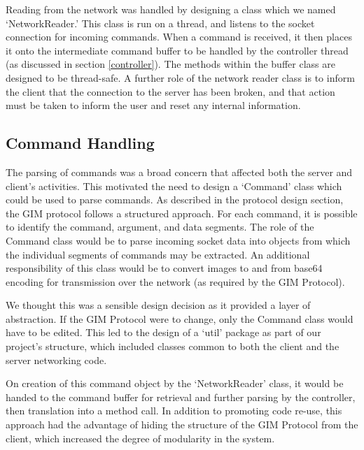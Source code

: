 Reading from the network was handled by designing a class which we named `NetworkReader.' This class is run on a thread, and listens to the socket connection for incoming commands. When a command is received, it then places it onto the intermediate command buffer to be handled by the controller thread (as discussed in section \ref{controller}). The methods within the buffer class are designed to be thread-safe. A further role of the network reader class is to inform the client that the connection to the server has been broken, and that action must be taken to inform the user and reset any internal information.

\subsection {Command Handling}

The parsing of commands was a broad concern that affected both the server and client's activities. This motivated the need to design a `Command' class which could be used to parse commands. As described in the protocol design section, the GIM protocol follows a structured approach. For each command, it is possible to identify the command, argument, and data segments. The role of the Command class would be to parse incoming socket data into objects from which the individual segments of commands may be extracted. An additional responsibility of this class would be to convert images to and from base64 encoding for transmission over the network (as required by the GIM Protocol).

We thought this was a sensible design decision as it provided a layer of abstraction. If the GIM Protocol were to change, only the Command class would have to be edited. This led to the design of a `util' package as part of our project's structure, which included classes common to both the client and the server networking code. 

On creation of this command object by the `NetworkReader' class, it would be handed to the command buffer for retrieval and further parsing by the controller, then translation into a method call. In addition to promoting code re-use, this approach had the advantage of hiding the structure of the GIM Protocol from the client, which increased the degree of modularity in the system.   

